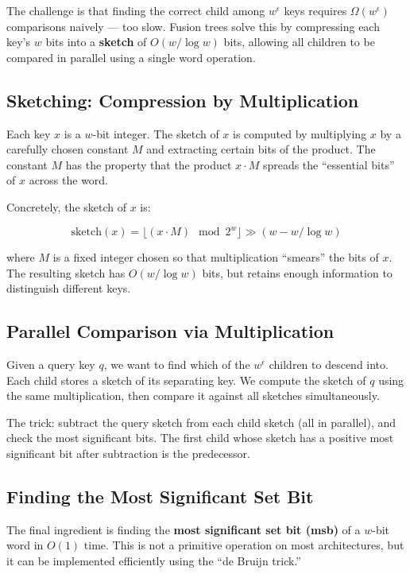 The challenge is that finding the correct child among $w^\epsilon$ keys requires $\Omega(w^\epsilon)$ comparisons naively --- too slow. Fusion trees solve this by compressing each key's $w$ bits into a \textbf{sketch} of $O(w / \log w)$ bits, allowing all children to be compared in parallel using a single word operation.

\subsection{Sketching: Compression by Multiplication}

Each key $x$ is a $w$-bit integer. The sketch of $x$ is computed by multiplying $x$ by a carefully chosen constant $M$ and extracting certain bits of the product. The constant $M$ has the property that the product $x \cdot M$ spreads the ``essential bits'' of $x$ across the word.

Concretely, the sketch of $x$ is:

\[
\text{sketch}(x) = \lfloor (x \cdot M) \mod 2^w \rfloor \gg (w - w/\log w)
\]

where $M$ is a fixed integer chosen so that multiplication ``smears'' the bits of $x$. The resulting sketch has $O(w / \log w)$ bits, but retains enough information to distinguish different keys.

\subsection{Parallel Comparison via Multiplication}

Given a query key $q$, we want to find which of the $w^\epsilon$ children to descend into. Each child stores a sketch of its separating key. We compute the sketch of $q$ using the same multiplication, then compare it against all sketches simultaneously.

The trick: subtract the query sketch from each child sketch (all in parallel), and check the most significant bits. The first child whose sketch has a positive most significant bit after subtraction is the predecessor.

\subsection{Finding the Most Significant Set Bit}

The final ingredient is finding the \textbf{most significant set bit (msb)} of a $w$-bit word in $O(1)$ time. This is not a primitive operation on most architectures, but it can be implemented efficiently using the ``de Bruijn trick.''

